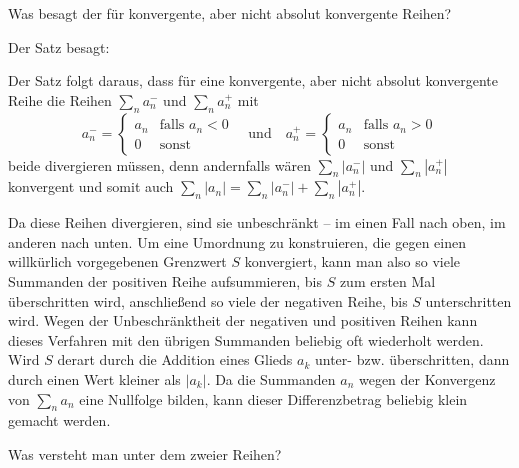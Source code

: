 \begin{frage}\label{02_diri}
  Was besagt der  für konvergente, 
  aber nicht absolut konvergente Reihen?
\end{frage}

\begin{antwort}
  Der Satz besagt: 

  \medskip\noindent

  \medskip\noindent
  Der Satz folgt daraus, dass für eine konvergente, aber nicht absolut 
  konvergente Reihe die Reihen $\sum_n a^-_n$ und $\sum_n a^+_n$ mit 
  \[
  a^-_n = \left\{\begin{array}{ll} 
      a_n & \text{falls $a_n < 0$} \\ 
      0   & \text{sonst}
    \end{array}\right.
  \quad\text{und}\quad 
  a^+_n = \left\{\begin{array}{ll} 
      a_n & \text{falls $a_n > 0$} \\ 
      0   & \text{sonst}
    \end{array}\right.
  \]
  beide divergieren müssen, denn andernfalls wären 
  $\sum_n |a^-_n| $ und $\sum_n |a^+_n| $ konvergent und somit auch 
  $\sum_n |a_n|=\sum_n |a^-_n|+\sum_n |a^+_n|$. 

  Da diese Reihen divergieren, sind sie unbeschränkt -- im einen Fall nach oben, 
  im anderen nach unten. Um eine Umordnung zu konstruieren, die gegen 
  einen willkürlich vorgegebenen Grenzwert $S$ konvergiert, kann man also  
  so viele Summanden der positiven Reihe aufsummieren, 
  bis $S$ zum ersten Mal überschritten wird, anschließend 
  so viele der negativen Reihe, bis $S$ unterschritten wird. 
  Wegen der Unbeschränktheit der negativen und positiven Reihen kann dieses 
  Verfahren mit den übrigen Summanden beliebig oft wiederholt werden. 
  Wird $S$ derart durch die Addition eines Glieds $a_k$ 
  unter- bzw. überschritten, 
  dann durch einen Wert kleiner als $|a_k|$. 
  Da die Summanden $a_n$ wegen der 
  Konvergenz von $\sum_n a_n$ eine Nullfolge bilden, 
  kann dieser Differenzbetrag 
  beliebig klein gemacht werden. 
  \AntEnd
\end{antwort}

\begin{frage}\label{02_cprod}
  Was versteht man unter dem  zweier Reihen?
\end{frage}


